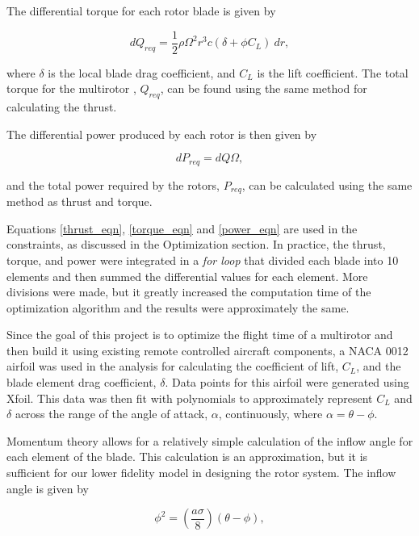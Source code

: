 \documentclass[letterpaper, 10 pt, conference]{ieeeconf}  %
\begin{document}
The differential torque for each rotor blade is given by

\begin{equation}
	dQ_{req} = \frac{1}{2} \rho \Omega^2 r^3 c (\delta + \phi C_L) \ dr,
	\label{torque_eqn}
\end{equation}

where $\delta$ is the local blade drag coefficient, and $C_L$ is the lift coefficient. The total torque for the multirotor , $Q_{req}$, can be found using the same method for calculating the thrust. 

The differential power produced by each rotor is then given by 

\begin{equation}
	dP_{req} = dQ\Omega,
	\label{power_eqn}
\end{equation}

and the total power required by the rotors, $P_{req}$, can be calculated using the same method as thrust and torque. 

Equations \ref{thrust_eqn}, \ref{torque_eqn} and \ref{power_eqn} are used in the constraints, as discussed in the Optimization section. In practice, the thrust, torque, and power were integrated in a \textit{for loop} that divided each blade into 10 elements and then summed the differential values for each element. More divisions were made, but it greatly increased the computation time of the optimization algorithm and the results were approximately the same. 

Since the goal of this project is to optimize the flight time of a multirotor and then build it using existing remote controlled aircraft components, a NACA 0012 airfoil was used in the analysis for calculating the coefficient of lift, $C_L$, and the blade element drag coefficient, $\delta$. Data points for this airfoil were generated using Xfoil. This data was then fit with polynomials to approximately represent $C_L$ and $\delta$ across the range of the angle of attack, $\alpha$, continuously, where $\alpha = \theta - \phi$. 

Momentum theory allows for a relatively simple calculation of the inflow angle for each element of the blade. This calculation is an approximation, but it is sufficient for our lower fidelity model in designing the rotor system. The inflow angle is given by 

\begin{equation}
\phi^2 = (\frac{a\sigma}{8})(\theta-\phi),
\label{inflow_eqn}
\end{equation}
\end{document}
